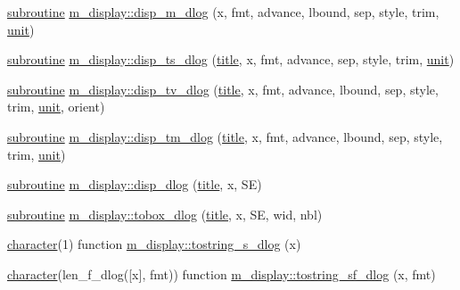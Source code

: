\begin{DoxyCompactItemize}
\item 
\hyperlink{M__stopwatch_83_8txt_acfbcff50169d691ff02d4a123ed70482}{subroutine} \hyperlink{namespacem__display_ab6b5841935e6e08ce9d8a293f2e7c18a}{m\+\_\+display\+::disp\+\_\+m\+\_\+dlog} (x, fmt, advance, lbound, sep, style, trim, \hyperlink{M__stopwatch_83_8txt_a5cbef30eb7c0d734bd82f5a7ebea9aa7}{unit})
\item 
\hyperlink{M__stopwatch_83_8txt_acfbcff50169d691ff02d4a123ed70482}{subroutine} \hyperlink{namespacem__display_a7d4d5976a28b9a9ee9bad6afb0f8a7b9}{m\+\_\+display\+::disp\+\_\+ts\+\_\+dlog} (\hyperlink{print__watch_83_8txt_a15b5bd21156bb9fca6a755ab8c029a9c}{title}, x, fmt, advance, sep, style, trim, \hyperlink{M__stopwatch_83_8txt_a5cbef30eb7c0d734bd82f5a7ebea9aa7}{unit})
\item 
\hyperlink{M__stopwatch_83_8txt_acfbcff50169d691ff02d4a123ed70482}{subroutine} \hyperlink{namespacem__display_af30fd70a2bb8a821b5f843bb6e4bedf8}{m\+\_\+display\+::disp\+\_\+tv\+\_\+dlog} (\hyperlink{print__watch_83_8txt_a15b5bd21156bb9fca6a755ab8c029a9c}{title}, x, fmt, advance, lbound, sep, style, trim, \hyperlink{M__stopwatch_83_8txt_a5cbef30eb7c0d734bd82f5a7ebea9aa7}{unit}, orient)
\item 
\hyperlink{M__stopwatch_83_8txt_acfbcff50169d691ff02d4a123ed70482}{subroutine} \hyperlink{namespacem__display_a0b5f8c9a84f77bedd9b8e6cd6bb8a093}{m\+\_\+display\+::disp\+\_\+tm\+\_\+dlog} (\hyperlink{print__watch_83_8txt_a15b5bd21156bb9fca6a755ab8c029a9c}{title}, x, fmt, advance, lbound, sep, style, trim, \hyperlink{M__stopwatch_83_8txt_a5cbef30eb7c0d734bd82f5a7ebea9aa7}{unit})
\item 
\hyperlink{M__stopwatch_83_8txt_acfbcff50169d691ff02d4a123ed70482}{subroutine} \hyperlink{namespacem__display_ac6960db2f07da55b2c8a72f30531ed97}{m\+\_\+display\+::disp\+\_\+dlog} (\hyperlink{print__watch_83_8txt_a15b5bd21156bb9fca6a755ab8c029a9c}{title}, x, SE)
\item 
\hyperlink{M__stopwatch_83_8txt_acfbcff50169d691ff02d4a123ed70482}{subroutine} \hyperlink{namespacem__display_abaf23628781d863ca3d9bba0b3b01707}{m\+\_\+display\+::tobox\+\_\+dlog} (\hyperlink{print__watch_83_8txt_a15b5bd21156bb9fca6a755ab8c029a9c}{title}, x, SE, wid, nbl)
\item 
\hyperlink{option__stopwatch_83_8txt_abd4b21fbbd175834027b5224bfe97e66}{character}(1) function \hyperlink{namespacem__display_a75e826c601efdb91148684ebaf34788b}{m\+\_\+display\+::tostring\+\_\+s\+\_\+dlog} (x)
\item 
\hyperlink{option__stopwatch_83_8txt_abd4b21fbbd175834027b5224bfe97e66}{character}(len\+\_\+f\+\_\+dlog(\mbox{[}x\mbox{]}, fmt)) function \hyperlink{namespacem__display_a833175a75a1f2563fb749394bc577196}{m\+\_\+display\+::tostring\+\_\+sf\+\_\+dlog} (x, fmt)

\end{DoxyCompactItemize}
